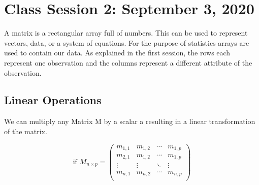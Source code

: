\chapter{Class Session 2: September 3, 2020}
\label{Review of matrices}
A matrix is a rectangular array full of numbers. This can be used to represent vectors, data, or a system of equations. For the purpose of statistics arrays are used to contain our data. As explained in  the first session, the rows each represent one observation and the columns represent a different attribute of the observation.

\section{Linear Operations}

 We can multiply any Matrix M by a scalar a resulting in a linear transformation of the matrix.

\begin{equation*}
\text{if    }M_{n \times p} = 
    \begin{pmatrix}
    m_{1,1} & m_{1,2} & \cdots & m_{1,p} \\
    m_{2,1} & m_{1,2} & \cdots & m_{1,p} \\
    \vdots & \vdots & \ddots & \vdots \\
    m_{n,1} & m_{n,2} & \cdots & m_{n,p} \\
    \end{pmatrix}
\end{equation*}


